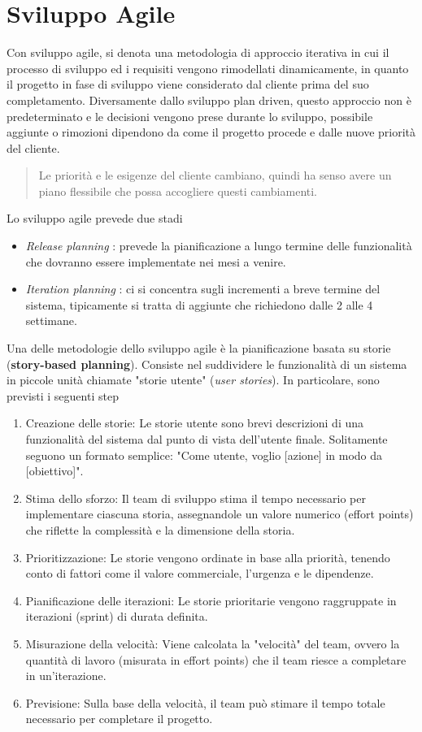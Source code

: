 \documentclass[10pt, letterpaper]{report}
\begin{document}
\section{Sviluppo Agile}
Con sviluppo agile, si denota una metodologia di approccio iterativa in cui il processo di sviluppo ed i 
requisiti vengono rimodellati dinamicamente, in quanto il progetto in fase di sviluppo viene 
considerato dal cliente prima del suo completamento. Diversamente dallo sviluppo plan driven, 
questo approccio non è predeterminato e le decisioni vengono prese durante lo sviluppo, 
possibile aggiunte o rimozioni dipendono da come il progetto procede e dalle nuove priorità del 
cliente.\begin{quote}
    Le priorità e le esigenze del cliente cambiano, quindi ha senso avere un piano flessibile che possa accogliere questi cambiamenti.
\end{quote}
Lo sviluppo agile prevede due stadi\begin{itemize}
    \item \textit{Release planning} : prevede la pianificazione a lungo termine 
    delle funzionalità che dovranno essere implementate nei mesi a venire.
    \item \textit{Iteration planning} : ci si concentra sugli incrementi a breve termine del 
    sistema, tipicamente si tratta di aggiunte che richiedono dalle 2 alle 4 settimane.
\end{itemize}
Una delle metodologie dello sviluppo agile è la 
 pianificazione basata su storie (\textbf{story-based planning}). 
 Consiste nel suddividere le funzionalità di un sistema in piccole unità chiamate 
 "storie utente" (\textit{user stories}). In particolare, sono previsti i seguenti step\begin{enumerate}
    \item Creazione delle storie: Le storie utente sono brevi descrizioni 
    di una funzionalità del sistema dal punto di vista dell'utente finale. 
    Solitamente seguono un formato semplice: "Come utente, voglio [azione] in modo
     da [obiettivo]".
     \item Stima dello sforzo: Il team di sviluppo stima 
     il tempo necessario per implementare ciascuna storia, 
     assegnandole un valore numerico (effort points) che riflette 
     la complessità e la dimensione della storia.
     \item Prioritizzazione: Le storie vengono ordinate in base alla priorità, tenendo 
     conto di fattori come il valore commerciale, l'urgenza e le dipendenze.
     \item Pianificazione delle iterazioni: Le storie prioritarie vengono 
     raggruppate in iterazioni (sprint) di durata definita.
     \item Misurazione della velocità: Viene calcolata la "velocità" del team, 
     ovvero la quantità di lavoro
      (misurata in effort points) che il team riesce a completare in un'iterazione.
      \item Previsione: Sulla base della velocità, il team può stimare il tempo totale 
      necessario per completare il progetto.
 \end{enumerate}
\end{document}
